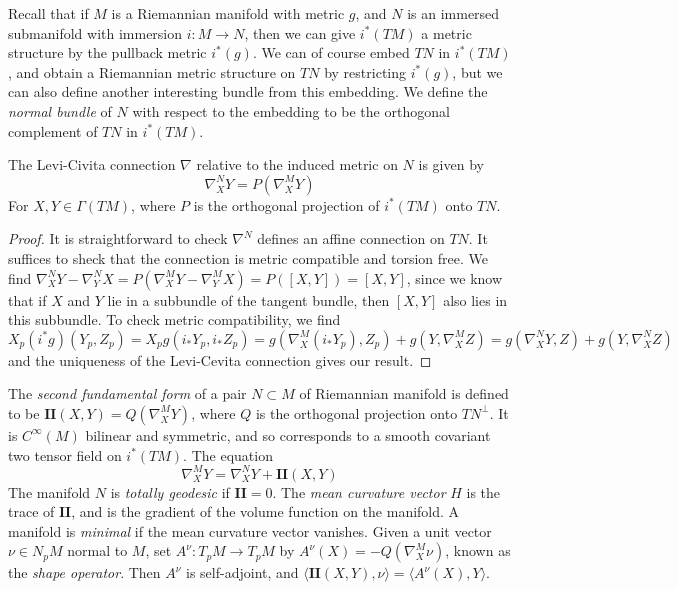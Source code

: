 Recall that if $M$ is a Riemannian manifold with metric $g$, and $N$ is an immersed submanifold with immersion $i: M \to N$, then we can give $i^*(TM)$ a metric structure by the pullback metric $i^*(g)$. We can of course embed $TN$ in $i^*(TM)$, and obtain a Riemannian metric structure on $TN$ by restricting $i^*(g)$, but we can also define another interesting bundle from this embedding. We define the \emph{normal bundle} of $N$ with respect to the embedding to be the orthogonal complement of $TN$ in $i^*(TM)$.

\begin{theorem}
    The Levi-Civita connection $\nabla$ relative to the induced metric on $N$ is given by
    \[ \nabla^N_X Y = P(\nabla^M_X Y) \]
    For $X,Y \in \Gamma(TM)$, where $P$ is the orthogonal projection of $i^*(TM)$ onto $TN$.
\end{theorem}
\begin{proof}
    It is straightforward to check $\nabla^N$ defines an affine connection on $TN$. It suffices to sheck that the connection is metric compatible and torsion free. We find $\nabla^N_X Y - \nabla^N_Y X = P(\nabla^M_X Y - \nabla^M_Y X) = P([X,Y]) = [X,Y]$, since we know that if $X$ and $Y$ lie in a subbundle of the tangent bundle, then $[X,Y]$ also lies in this subbundle. To check metric compatibility, we find
    \[ X_p (i^*g)(Y_p,Z_p) = X_p g(i_* Y_p, i_* Z_p) = g(\nabla^M_X (i_* Y_p), Z_p) + g(Y, \nabla^M_X Z) = g(\nabla^N_X Y, Z) + g(Y, \nabla^N_X Z) \]
    and the uniqueness of the Levi-Cevita connection gives our result.
\end{proof}

The \emph{second fundamental form} of a pair $N \subset M$ of Riemannian manifold is defined to be $\mathbf{II}(X,Y) = Q(\nabla^M_X Y)$, where $Q$ is the orthogonal projection onto $TN^\perp$. It is $C^\infty(M)$ bilinear and symmetric, and so corresponds to a smooth covariant two tensor field on $i^*(TM)$. The equation
%
\[ \nabla^M_X Y = \nabla^N_X Y + \mathbf{II}(X,Y) \]
%
The manifold $N$ is \emph{totally geodesic} if $\mathbf{II} = 0$. The \emph{mean curvature vector} $H$ is the trace of $\mathbf{II}$, and is the gradient of the volume function on the manifold. A manifold is \emph{minimal} if the mean curvature vector vanishes. Given a unit vector $\nu \in N_p M$ normal to $M$, set $A^\nu: T_p M \to T_p M$ by $A^\nu(X) = -Q(\nabla^M_X \nu)$, known as the \emph{shape operator}. Then $A^\nu$ is self-adjoint, and $\langle \mathbf{II}(X,Y), \nu \rangle = \langle A^\nu(X), Y \rangle$.

